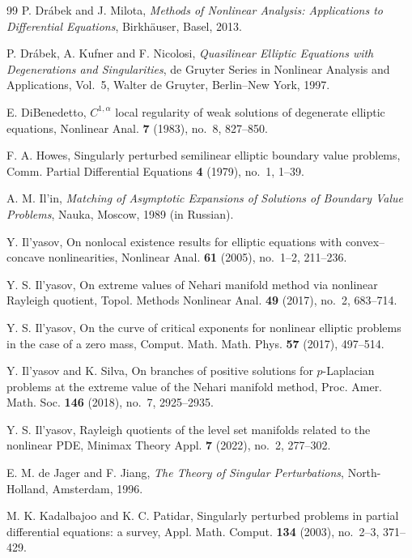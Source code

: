 \documentclass[preprint,11pt]{elsarticle}
\numberwithin{equation}{section}
\begin{document}
\begin{thebibliography}{99}
	P. Dr\'abek and J. Milota,
	\textit{Methods of Nonlinear Analysis: Applications to Differential Equations},
	Birkh\"auser, Basel, 2013.
	
	P. Dr\'abek, A. Kufner and F. Nicolosi,
	\textit{Quasilinear Elliptic Equations with Degenerations and Singularities},
	de Gruyter Series in Nonlinear Analysis and Applications, Vol.~5,
	Walter de Gruyter, Berlin--New York, 1997.
	
	E. DiBenedetto,
	\(C^{1,\alpha}\) local regularity of weak solutions of degenerate elliptic
	equations,
	Nonlinear Anal. \textbf{7} (1983), no.~8, 827--850.
	
	F. A. Howes,
	Singularly perturbed semilinear elliptic boundary value problems,
	Comm. Partial Differential Equations \textbf{4} (1979), no.~1, 1--39.
	
	A. M. Il'in,
	\textit{Matching of Asymptotic Expansions of Solutions of Boundary Value Problems},
	Nauka, Moscow, 1989 (in Russian).
	
	Y. Il'yasov,
	On nonlocal existence results for elliptic equations with convex--concave
	nonlinearities,
	Nonlinear Anal. \textbf{61} (2005), no.~1--2, 211--236.
	
	Y. S. Il'yasov,
	On extreme values of Nehari manifold method via nonlinear Rayleigh quotient,
	Topol. Methods Nonlinear Anal. \textbf{49} (2017), no.~2, 683--714.
	
	Y. S. Il'yasov,
	On the curve of critical exponents for nonlinear elliptic problems in the case
	of a zero mass,
	Comput. Math. Math. Phys. \textbf{57} (2017), 497--514.
	
	Y. Il'yasov and K. Silva,
	On branches of positive solutions for \(p\)-Laplacian problems at the extreme
	value of the Nehari manifold method,
	Proc. Amer. Math. Soc. \textbf{146} (2018), no.~7, 2925--2935.
	
	Y. S. Il'yasov,
	Rayleigh quotients of the level set manifolds related to the nonlinear PDE,
	Minimax Theory Appl. \textbf{7} (2022), no.~2, 277--302.
	
	E. M. de Jager and F. Jiang,
	\textit{The Theory of Singular Perturbations},
	North-Holland, Amsterdam, 1996.
	
	M. K. Kadalbajoo and K. C. Patidar,
	Singularly perturbed problems in partial differential equations: a survey,
	Appl. Math. Comput. \textbf{134} (2003), no.~2--3, 371--429.
	

\end{thebibliography}
\end{document}
